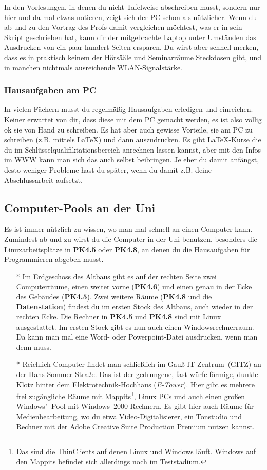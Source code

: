 \begin{multicols}{2}
			In den Vorlesungen, in denen du nicht Tafelweise abschreiben musst, sondern nur hier und da mal etwas notieren, zeigt sich der PC schon als nützlicher. Wenn du ab und zu den Vortrag des Profs damit vergleichen möchtest, was er in sein Skript geschrieben hat, kann dir der mitgebrachte Laptop unter Umständen das Ausdrucken von ein paar hundert Seiten ersparen. Du wirst aber schnell merken, dass es in praktisch keinem der Hörsääle und Seminarräume Steckdosen gibt, und in manchen nichtmals ausreichende WLAN-Signalstärke.

		\subsubsection{Hausaufgaben am PC}
			In vielen Fächern musst du regelmäßig Hausaufgaben erledigen und einreichen. Keiner erwartet von dir, dass diese mit dem PC gemacht werden, es ist also völlig ok sie von Hand zu schreiben. Es hat aber auch gewisse Vorteile, sie am PC zu schreiben (z.B. mittels \LaTeX) und dann auszudrucken. Es gibt \LaTeX-Kurse die du im Schlüsselqualifiktationsbereich anrechnen lassen kannst, aber mit den Infos im WWW kann man sich das auch selbst beibringen. Je eher du damit anfängst, desto weniger Probleme hast du später, wenn du damit z.B. deine Abschlussarbeit aufsetzt.

		\subsection{Computer-Pools an der Uni}
			Es ist immer nützlich zu wissen, wo man mal schnell an einen Computer kann. Zumindest ab und zu wirst du die Computer in der Uni benutzen, besonders die Linuxarbeitsplätze in \textbf{PK4.5} oder \textbf{PK4.8}, an denen du die Hausaufgaben für Programmieren abgeben musst.

			\begin{itemize}
				\item[*] Im Erdgeschoss des Altbaus gibt es auf der rechten Seite zwei Computerräume, einen weiter vorne (\textbf{PK4.6}) und einen genau in der Ecke des Gebäudes (\textbf{PK4.5}). Zwei weitere Räume (\textbf{PK4.8} und die \textbf{Datenstation}) findest du im ersten Stock des Altbaus, auch wieder in der rechten Ecke. Die Rechner in \textbf{PK4.5} und \textbf{PK4.8} sind mit Linux ausgestattet. Im ersten Stock gibt es nun auch einen Windowsrechnerraum. Da kann man mal eine Word- oder Powerpoint-Datei ausdrucken, wenn man denn muss.

				\item[*] Reichlich Computer findet man schließlich im Gauß-IT-Zentrum~(GITZ) an der Hans-Sommer-Straße. Das ist der gedrungene, fast würfelförmige, dunkle Klotz hinter dem Elektrotechnik-Hochhaus (\emph{E-Tower}). Hier gibt es mehrere frei zugängliche Räume mit Mappits\footnote{Das sind die ThinClients auf denen Linux und Windows läuft. Windows auf den Mappits befindet sich allerdings noch im Teststadium.}, Linux PCs und auch einen großen Windows"~Pool mit Windows~2000 Rechnern. Es gibt hier auch Räume für Medienbearbeitung, wo du etwa Video-Digitalisierer, ein Tonstudio und Rechner mit der Adobe Creative Suite Production Premium nutzen kannst.


\end{itemize}
\end{multicols}
